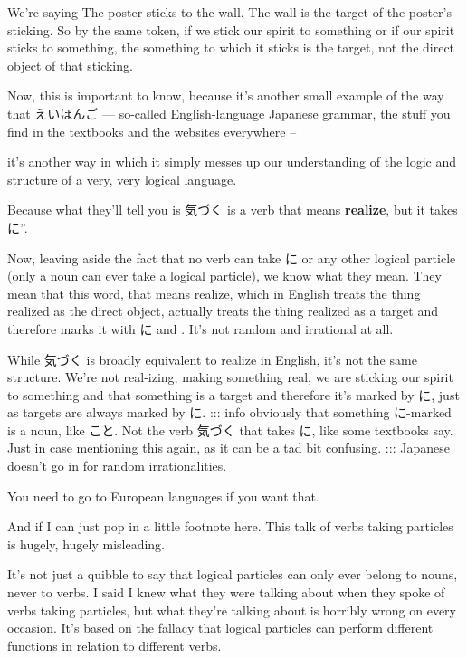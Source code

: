 We're saying The poster sticks to the wall. The wall is the target of the poster's sticking. So by the same token, if we stick our spirit to something or if our spirit sticks to something, the something to which it sticks is the target, not the direct object of that sticking.

Now, this is important to know, because it's another small example of the way that えいほんご --- so-called English-language Japanese grammar, the stuff you find in the textbooks and the websites everywhere --

{}

it's another way in which it simply messes up our understanding of the logic and structure of a very, very logical language.

Because what they'll tell you is 気づく is a verb that means {\bf realize}, but it takes に”.

Now, leaving aside the fact that no verb can take に or any other logical particle (only a noun can ever take a logical particle), we know what they mean. They mean that this word, that means realize, which in English treats the thing realized as the direct object, actually treats the thing realized as a target and therefore marks it with に and . It's not random and irrational at all.

{}

While 気づく is broadly equivalent to realize in English, it's not the same structure. We're not real-izing, making something real, we are sticking our spirit to something and that something is a target and therefore it's marked by に, just as targets are always marked by に. ::: info obviously that something に-marked is a noun, like こと. Not the verb 気づく that takes に, like some textbooks say. Just in case mentioning this again, as it can be a tad bit confusing. ::: Japanese doesn't go in for random irrationalities.

You need to go to European languages if you want that.

And if I can just pop in a little footnote here. This talk of verbs taking particles is hugely, hugely misleading.

{}

It's not just a quibble to say that logical particles can only ever belong to nouns, never to verbs. I said I knew what they were talking about when they spoke of verbs taking particles, but what they're talking about is horribly wrong on every occasion. It's based on the fallacy that logical particles can perform different functions in relation to different verbs.

